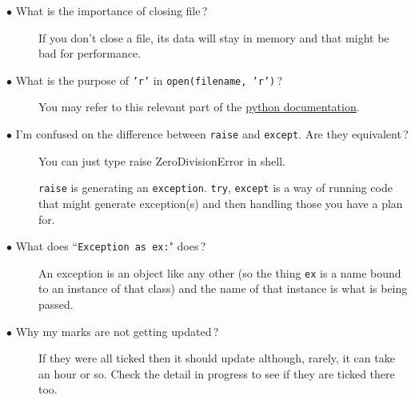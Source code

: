 \documentclass{article}
\newcommand{\inlinecode}[1]{\texttt{#1}}
\newcommand{\link}[2]{\textcolor{blue}{\href{#2}{#1}}}
\newcommand{\question}[1]{\item[$\bullet$ #1] \hfil}
\newenvironment{answer}{}{}
\newenvironment{faq}{\begin{description}}{\end{description}}
\begin{document}
\begin{faq}
		\question{What is the importance of closing file\,?}
		
		\begin{answer}
			If you don't close a file, its data will stay in memory and that might be bad for performance.
		\end{answer}
		
		\question{What is the purpose of \inlinecode{'r'} in \inlinecode{open(filename, 'r')}\,?}
		
		\begin{answer}
			You may refer to this relevant part of the \link{python documentation}{https://docs.python.org/3/tutorial/inputoutput.html\#reading-and-writing-files}.
		\end{answer}
		
		\question{I'm confused on the difference between \inlinecode{raise} and \inlinecode{except}. Are they equivalent\,?}
		
		\begin{answer}
			You can just type raise ZeroDivisionError in shell.
			
			\inlinecode{raise} is generating an \inlinecode{exception}. \inlinecode{try}, \inlinecode{except} is a way of running code that might generate exception(s) and then handling those you have a plan for.
		\end{answer}
		
		\question{What does ``\inlinecode{Exception as ex:}" does\,?}
		
		\begin{answer}
			An exception is an object like any other (so the thing \inlinecode{ex} is a name bound to an instance of that class) and the name of that instance is what is being passed.
		\end{answer}
		
		\question{Why my marks are not getting updated\,?}
		
		\begin{answer}
			If they were all ticked then it should update although, rarely, it can take an hour or so. Check the detail in progress to see if they are ticked there too.
		\end{answer}
	\end{faq}
	
\end{document}
